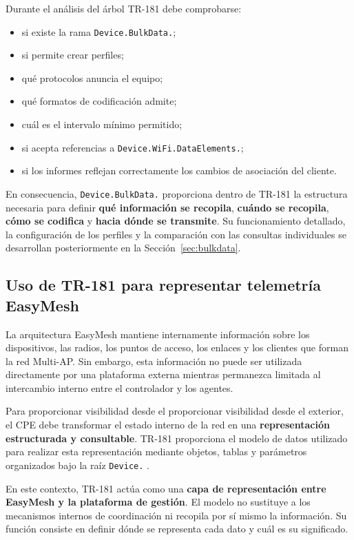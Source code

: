 Durante el análisis del árbol TR-181 debe comprobarse:

\begin{itemize}
    \item si existe la rama \texttt{Device.BulkData.};
    \item si permite crear perfiles;
    \item qué protocolos anuncia el equipo;
    \item qué formatos de codificación admite;
    \item cuál es el intervalo mínimo permitido;
    \item si acepta referencias a
    \texttt{Device.WiFi.DataElements.};
    \item si los informes reflejan correctamente los cambios de
    asociación del cliente.
\end{itemize}

En consecuencia, \texttt{Device.BulkData.} proporciona dentro de TR-181
la estructura necesaria para definir
\textbf{qué información se recopila}, \textbf{cuándo se recopila},
\textbf{cómo se codifica} y \textbf{hacia dónde se transmite}. Su
funcionamiento detallado, la configuración de los perfiles y la
comparación con las consultas individuales se desarrollan posteriormente
en la Sección~\ref{sec:bulkdata}.

\subsection{Uso de TR-181 para representar telemetría EasyMesh}
\label{subsec:uso-tr181-telemetria-easymesh}

La arquitectura EasyMesh mantiene internamente información sobre los
dispositivos, las radios, los puntos de acceso, los enlaces y los
clientes que forman la red Multi-AP. Sin embargo, esta información no
puede ser utilizada directamente por una plataforma externa mientras
permanezca limitada al intercambio interno entre el controlador y los
agentes.

Para proporcionar visibilidad desde el proporcionar visibilidad desde el exterior, el CPE debe transformar
el estado interno de la red en una
\textbf{representación estructurada y consultable}. TR-181 proporciona
el modelo de datos utilizado para realizar esta representación mediante
objetos, tablas y parámetros organizados bajo la raíz
\texttt{Device.} \cite{bbf_tr181}.

En este contexto, TR-181 actúa como una
\textbf{capa de representación entre EasyMesh y la plataforma de
gestión}. El modelo no sustituye a los mecanismos internos de
coordinación ni recopila por sí mismo la información. Su función consiste
en definir dónde se representa cada dato y cuál es su significado.

